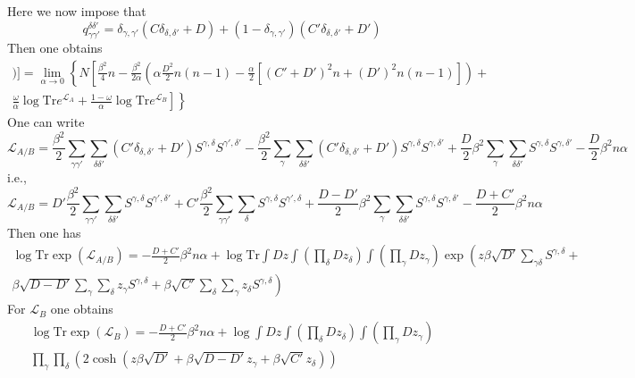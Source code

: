 \documentclass[onecolumn,superscriptaddress,pr]{revtex4}
\def\tr{\textrm{Tr}}
\begin{document}
Here we now impose that
%
\begin{equation}
q_{\gamma\gamma'}^{\delta\delta'}=\delta_{\gamma,\gamma'}
(C\delta_{\delta,\delta'}+D)+(1-\delta_{\gamma,\gamma'})
(C'\delta_{\delta,\delta'}+D')
\end{equation}
%
Then one obtains 
%
\begin{multline}
[\log(Z[A,n,\beta])]=\lim_{\alpha\to 0}\left\{
N\left[\frac{\beta^2}{4}n-\frac{\beta^2}{2\alpha}\left(
\alpha\frac{D^2}{2}n(n-1)
-\frac{\alpha}{2}[(C'+D')^2n+(D')^2n(n-1)]\right)
+\right.\right.\\\left.\left.
\frac{\omega}{\alpha}\log\tr e^{{\mathcal L}_A}
+\frac{1-\omega}{\alpha}\log\tr e^{{\mathcal L}_B}\right]\right\}
\end{multline}
%
One can write
%
\begin{equation}
{\mathcal L}_{A/B}=\frac{\beta^2}{2}\sum\limits_{\gamma\gamma'}
\sum_{\delta\delta'}
(C'\delta_{\delta,\delta'}+D')S^{\gamma,\delta}S^{\gamma',\delta'} 
-\frac{\beta^2}{2}\sum_\gamma\sum_{\delta\delta'}(C'\delta_{\delta,\delta'}+D')S^{\gamma,\delta}S^{\gamma,\delta'}+\frac{D}{2}\beta^2\sum_\gamma\sum_{\delta\delta'}
S^{\gamma,\delta}S^{\gamma,\delta'}-\frac{D}{2}\beta^2n\alpha
\end{equation}
%
i.e.,
%
\begin{equation}
{\mathcal L}_{A/B}=D'\frac{\beta^2}{2}\sum\limits_{\gamma\gamma'}
\sum_{\delta\delta'}
S^{\gamma,\delta}S^{\gamma',\delta'} 
+C'\frac{\beta^2}{2}\sum\limits_{\gamma\gamma'}
\sum_{\delta}
S^{\gamma,\delta}S^{\gamma',\delta} 
+\frac{D-D'}{2}\beta^2\sum_\gamma\sum_{\delta\delta'}
S^{\gamma,\delta}S^{\gamma,\delta'}-\frac{D+C'}{2}\beta^2n\alpha
\end{equation}
%
Then one has
%
\begin{multline}
\log\tr\exp({\mathcal L}_{A/B})=
-\frac{D+C'}{2}\beta^2 n\alpha+\log\tr\int Dz\int\left(
\prod_\delta Dz_\delta\right)\int\left(\prod_\gamma Dz_\gamma
\right)\exp\left(z\beta\sqrt{D'}\sum_{\gamma\delta}S^{\gamma,
\delta}+\right.\\\left.\beta\sqrt{D-D'}\sum_\gamma\sum_\delta 
z_\gamma S^{\gamma,\delta}+\beta\sqrt{C'}\sum_\delta\sum_\gamma 
z_\delta S^{\gamma,\delta}\right)
\end{multline}
%
For ${\mathcal L}_B$ one obtains 
%
\begin{multline}
\log\tr\exp({\mathcal L}_{B})=
-\frac{D+C'}{2}\beta^2 n\alpha+\log\int Dz\int\left(
\prod_\delta Dz_\delta\right)\int \left(\prod_\gamma 
Dz_\gamma\right)\\\prod_\gamma\prod_\delta
\left(2\cosh(z\beta\sqrt{D'}+\beta\sqrt{D-D'}z_\gamma 
+\beta\sqrt{C'}z_\delta)\right)
\end{multline}
\end{document}

